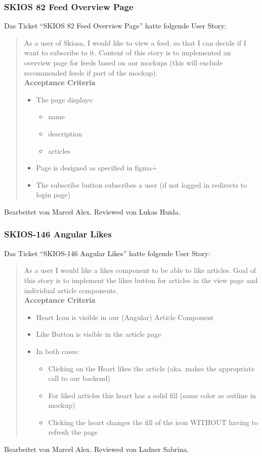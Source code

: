 \subsubsection{SKIOS 82 Feed Overview Page}
Das Ticket \enquote{SKIOS 82 Feed Overview Page} hatte folgende User Story:
\begin{quotation}
As a user of Skiosa, I would like to view a feed, so that I can decide if I want to subscribe to it.
Content of this story is to implemented an overview page for feeds based on our mockups (this will exclude recommended feeds if part of the mockup). \\
\textbf{Acceptance Criteria}
\begin{itemize}
    \item The page displays: 
    \begin{itemize}
        \item name
        \item description
        \item articles
    \end{itemize}
    \item Page is designed as specified in figma+
    \item The subscribe button subscribes a user (if not logged in redirects to login page)
\end{itemize}
\end{quotation}
Bearbeitet von Marcel Alex.
Reviewed von Lukas Huida.

\subsubsection{SKIOS-146 Angular Likes}
Das Ticket \enquote{SKIOS-146 Angular Likes} hatte folgende User Story:
\begin{quotation}
As a user I would like a likes component to be able to like articles.
Goal of this story is to implement the likes button for articles in the view page and individual article components. \\
\textbf{Acceptance Criteria}
\begin{itemize}
    \item Heart Icon is visible in our (Angular) Article Component
    \item Like Button is visible in the article page
    \item In both cases:
    \begin{itemize}
        \item Clicking on the Heart likes the article (aka. makes the appropriate call to our backend)
        \item For liked articles this heart has a solid fill (same color as outline in mockup)
        \item Clicking the heart changes the fill of the icon WITHOUT having to refresh the page
    \end{itemize}
\end{itemize}
\end{quotation}
Bearbeitet von Marcel Alex.
Reviewed von Ladner Sabrina.